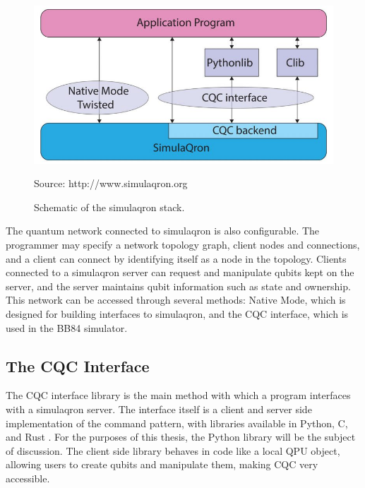 \begin{figure}[htp]
\centering
\includegraphics[scale=0.30]{images/CQC_schematic.jpg}
\caption{Schematic of the simulaqron stack.}
Source: http://www.simulaqron.org
\label{}
\end{figure}

The quantum network connected to simulaqron is also configurable. 
The programmer may specify a network topology graph, client nodes and connections, and a client can connect by identifying itself as a node in the topology.
Clients connected to a simulaqron server can request and manipulate qubits kept on the server, and the server maintains qubit information such as state and ownership.
This network can be accessed through several methods: Native Mode, which is designed for building interfaces to simulaqron, and the CQC interface, which is used in the BB84 simulator.

\subsection{The CQC Interface}
The CQC interface library is the main method with which a program interfaces with a simulaqron server.
The interface itself is a client and server side implementation of the command pattern, with libraries available in Python, C, and Rust \cite{simulaqron}.
For the purposes of this thesis, the Python library will be the subject of discussion.
The client side library behaves in code like a local QPU object, allowing users to create qubits and manipulate them, making CQC very accessible.

